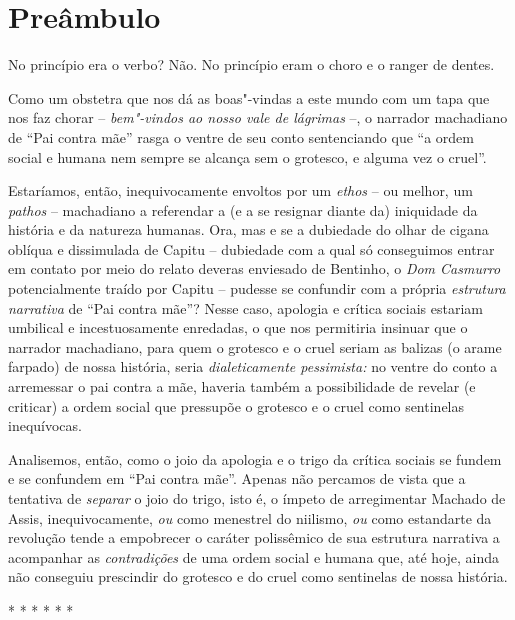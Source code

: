 \section{Preâmbulo}

No princípio era o verbo? Não. No princípio eram o choro e o ranger de
dentes.

Como um obstetra que nos dá as boas"-vindas a este mundo com um tapa que
nos faz chorar -- \emph{bem"-vindos ao nosso vale de lágrimas} --, o
narrador machadiano de ``Pai contra mãe'' rasga o ventre de seu conto
sentenciando que ``a ordem social e humana nem sempre se alcança sem o
grotesco, e alguma vez o cruel''.

Estaríamos, então, inequivocamente envoltos por um \emph{ethos} -- ou
melhor, um \emph{pathos} -- machadiano a referendar a (e a se resignar
diante da) iniquidade da história e da natureza humanas. Ora, mas e se a
dubiedade do olhar de cigana oblíqua e dissimulada de Capitu --
dubiedade com a qual só conseguimos entrar em contato por meio do relato
deveras enviesado de Bentinho, o \emph{Dom Casmurro} potencialmente
traído por Capitu -- pudesse se confundir com a própria \emph{estrutura
narrativa} de ``Pai contra mãe''? Nesse caso, apologia e crítica sociais
estariam umbilical e incestuosamente enredadas, o que nos permitiria
insinuar que o narrador machadiano, para quem o grotesco e o cruel
seriam as balizas (o arame farpado) de nossa história, seria
\emph{dialeticamente pessimista:} no ventre do conto a arremessar o pai
contra a mãe, haveria também a possibilidade de revelar (e criticar) a
ordem social que pressupõe o grotesco e o cruel como sentinelas
inequívocas.

Analisemos, então, como o joio da apologia e o trigo da crítica sociais
se fundem e se confundem em ``Pai contra mãe''. Apenas não percamos de
vista que a tentativa de \emph{separar} o joio do trigo, isto é, o
ímpeto de arregimentar Machado de Assis, inequivocamente, \emph{ou} como
menestrel do niilismo, \emph{ou} como estandarte da revolução tende a
empobrecer o caráter polissêmico de sua estrutura narrativa a acompanhar
as \emph{contradições} de uma ordem social e humana que, até hoje, ainda
não conseguiu prescindir do grotesco e do cruel como sentinelas de nossa
história.

* * * * * *

